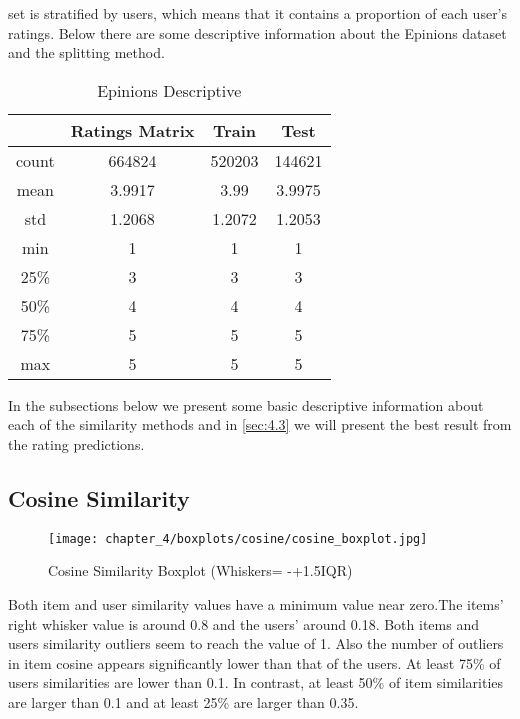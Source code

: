 set is stratified by users, which means that it contains a proportion of each
user's ratings. Below there are some descriptive information about the Epinions dataset and the splitting method.
\begin{table}[H]
\centering
\caption{Epinions Descriptive}
\label{table:epinions_descriptive}
\begin{tabular}{ |c|c|c|c| }
\hline
&\textbf{Ratings Matrix} & \textbf{Train} & \textbf{Test}\\
\hline
count & 664824 & 520203 & 144621\\
\hline
mean & 3.9917 & 3.99 & 3.9975\\
\hline
std & 1.2068 & 1.2072 & 1.2053\\
\hline
min & 1 & 1 & 1\\
\hline
25\% & 3 & 3 & 3\\
\hline
50\% & 4 & 4 & 4\\
\hline
75\% & 5 & 5 & 5\\
\hline
max & 5 & 5 & 5\\
\hline
\end{tabular}
\end{table}

In the subsections below we present some basic descriptive information about each of the similarity
methods and in \autoref{sec:4.3} we will present the best result from the
rating predictions.

\subsection{Cosine Similarity}

\begin{figure}[H]
\centering
\texttt{[image: chapter\_4/boxplots/cosine/cosine\_boxplot.jpg]}
\caption{Cosine Similarity Boxplot (Whiskers= -+1.5IQR)}
\label{figure:cosine_similarity_boxplot}
\end{figure}

Both item and user similarity values have a minimum value near zero.The items' right whisker value is
around 0.8 and the users' around 0.18. Both items and users similarity outliers seem to reach the value of 1.
Also the number of outliers in item cosine appears significantly lower than that of the users.
At least 75\% of users similarities are lower than 0.1. In contrast, at least 50\% of
item similarities are larger than 0.1 and at least 25\% are larger than 0.35.


